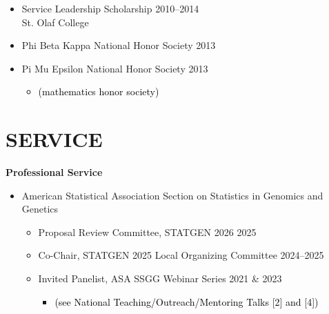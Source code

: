 \documentclass[margin]{res}
\newcommand{\annotateItem}[1]{
	\begin{itemize} \vspace{-0.1cm}
	\item[] 
	\begin{footnotesize}\textcolor{black}{(#1)}\end{footnotesize}
	\end{itemize} \vspace{-0.1cm}
}
\begin{document}
\begin{resume}
\begin{itemize}
\item Service Leadership Scholarship \hfill 2010--2014 \\
St. Olaf College 

\item Phi Beta Kappa National Honor Society \hfill 2013 

\item Pi Mu Epsilon National Honor Society \hfill 2013 %
  \annotateItem{mathematics honor society}


\end{itemize}







\section{SERVICE}  

\textbf{Professional Service}
	\begin{itemize}
	
	\item American Statistical Association Section on Statistics in Genomics and Genetics
		\begin{itemize}
		
		\item Proposal Review Committee, STATGEN 2026  \hfill 2025
		
		\item Co-Chair, STATGEN 2025 Local Organizing Committee \hfill 2024--2025
		
		\item Invited Panelist, ASA SSGG Webinar Series \hfill 2021 \& 2023 
			\annotateItem{see National Teaching/Outreach/Mentoring Talks [2] and [4]}
		

\end{itemize}
\end{itemize}
\end{resume}
\end{document}
